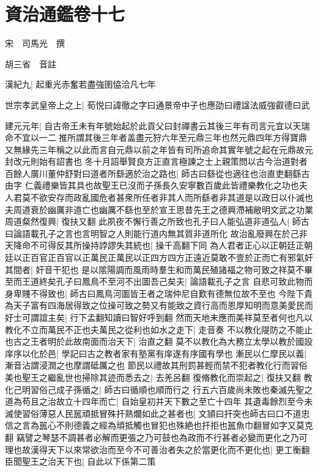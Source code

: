 \chapter{資治通鑑卷十七}
宋　司馬光　撰

胡三省　音註

漢紀九|{
	起重光赤奮若盡強圉恊洽凡七年}


世宗孝武皇帝上之上|{
	荀悦曰諱徹之字曰通景帝中子也應劭曰禮諡法威強叡德曰武}


建元元年|{
	自古帝王未有年號始起於此貢父曰封禪書云其後三年有司言元宜以天瑞命不宜以一二推所謂其後三年者盖盡元狩六年至元鼎三年也然元鼎四年方得寶鼎又無緣先三年稱之以此而言自元鼎以前之年皆有司所追命其實年號之起在元鼎故元封改元則始有詔書也}
冬十月詔舉賢良方正直言極諫之士上親策問以古今治道對者百餘人廣川董仲舒對曰道者所繇適於治之路也|{
	師古曰繇從也適往也治直吏翻繇古由字}
仁義禮樂皆其具也故聖王已沒而子孫長久安寧數百歲此皆禮樂教化之功也夫人君莫不欲安存而政亂國危者甚衆所任者非其人而所繇者非其道是以政日以仆滅也夫周道衰於幽厲非道亡也幽厲不繇也至於宣王思昔先王之德興滯補敝明文武之功業周道粲然復興|{
	復扶又翻}
此夙夜不懈行善之所致也孔子曰人能弘道非道弘人|{
	師古曰論語載孔子之言也言明智之人則能行道内無其質非道所化}
故治亂廢興在於己非天降命不可得反其所操持誖謬失其統也|{
	操千高翻下同}
為人君者正心以正朝廷正朝廷以正百官正百官以正萬民正萬民以正四方四方正遠近莫敢不壹於正而亡有邪氣奸其間者|{
	奸音干犯也}
是以隂陽調而風雨時羣生和而萬民殖諸福之物可致之祥莫不畢至而王道終矣孔子曰鳳鳥不至河不出圖吾己矣夫|{
	論語載孔子之言}
自悲可致此物而身卑賤不得致也|{
	師古曰鳳鳥河圖皆王者之瑞仲尼自歎有德無位故不至也}
今陛下貴為天子富有四海居得致之位操可致之勢又有能致之資行高而恩厚知明而意美愛民而好士可謂誼主矣|{
	行下孟翻知讀曰智好呼到翻}
然而天地未應而美祥莫至者何也凡以教化不立而萬民不正也夫萬民之從利也如水之走下|{
	走音奏}
不以教化隄防之不能止也古之王者明於此故南面而治天下|{
	治直之翻}
莫不以教化為大務立太學以教於國設庠序以化於邑|{
	學記曰古之教者家有塾黨有庠遂有序國有學也}
漸民以仁摩民以義|{
	漸音沾謂浸潤之也摩謂砥厲之也}
節民以禮故其刑罰甚輕而禁不犯者教化行而習俗美也聖王之繼亂世也掃除其迹而悉去之|{
	去羌呂翻}
復脩教化而崇起之|{
	復扶又翻}
教化己明習俗己成子孫循之|{
	師古曰循順也順而行之}
行五六百歲尚未敗也秦滅先聖之道為苟且之治故立十四年而亡|{
	自始皇初并天下數之至亡十四年}
其遺毒餘烈至今未滅使習俗薄惡人民嚚頑抵冒殊扞熟爛如此之甚者也|{
	文頴曰扞突也師古曰口不道忠信之言為嚚心不則德義之經為頑抵觸也冒犯也殊絶也扞拒也嚚魚巾翻冒如字又莫克翻}
竊譬之琴瑟不調甚者必解而更張之乃可鼓也為政而不行甚者必變而更化之乃可理也故漢得天下以來常欲治而至今不可善治者失之於當更化而不更化也|{
	更工衡翻}
臣聞聖王之治天下也|{
	自此以下係第二策}
